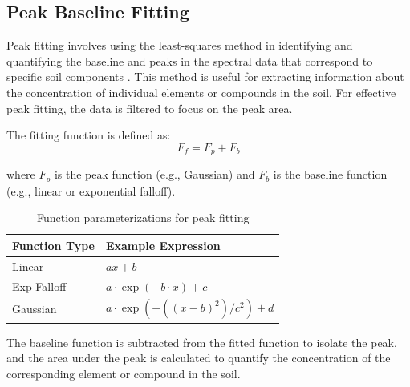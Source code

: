 \subsection{Peak Baseline Fitting}

Peak fitting involves using the least-squares method in identifying and quantifying the baseline and peaks in the spectral data that correspond to specific soil components \cite{gardner_use_2011}. This method is useful for extracting information about the concentration of individual elements or compounds in the soil. For effective peak fitting, the data is filtered to focus on the peak area.

The fitting function is defined as:
\begin{equation}
F_f = F_p + F_b
\end{equation}

where $F_p$ is the peak function (e.g., Gaussian) and $F_b$ is the baseline function (e.g., linear or exponential falloff).

\begin{table}[H]
\centering
\caption{Function parameterizations for peak fitting}
\label{tab:functions}
\begin{tabular}{ll}
\toprule
Function Type & Example Expression \\
\midrule
Linear & $ax + b$ \\
Exp Falloff & $a \cdot \exp(-b \cdot x) + c$ \\
Gaussian & $a \cdot \exp(-((x - b)^2)/c^2) + d$ \\
\bottomrule
\end{tabular}
\end{table}

The baseline function is subtracted from the fitted function to isolate the peak, and the area under the peak is calculated to quantify the concentration of the corresponding element or compound in the soil.


